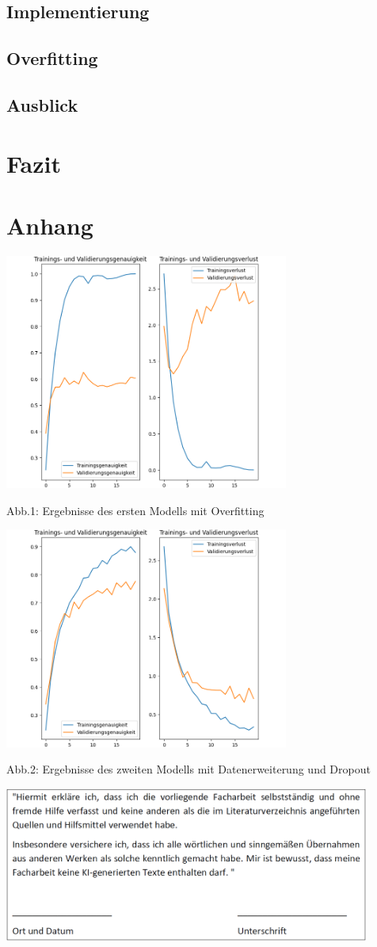 \documentclass[11pt,oneside]{report}
\begin{document}
\section{Implementierung}
\blindtext

\section{Overfitting}
\blindtext

\section{Ausblick}
\blindtext


\chapter{Fazit}
\blindtext


\appendix
\chapter{Anhang}

\includegraphics[width=0.7\textwidth]{model_overfitting}

Abb.1: Ergebnisse des ersten Modells mit Overfitting

\includegraphics[width=0.7\textwidth]{model}

Abb.2: Ergebnisse des zweiten Modells mit Datenerweiterung und Dropout

\newpage

\includegraphics[width=0.9\textwidth]{selbststaendigkeitserklaerung}
\end{document}
